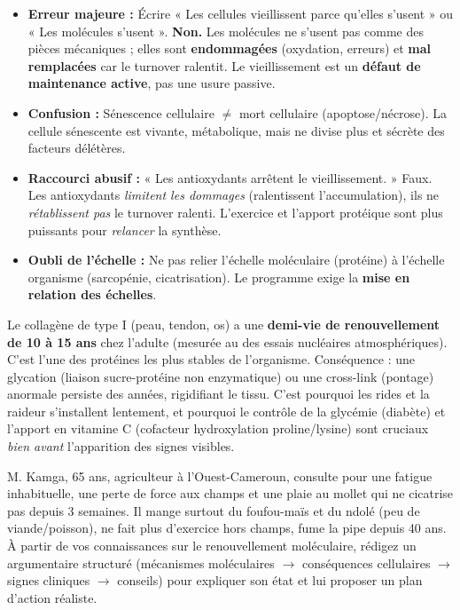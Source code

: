 \documentclass[11pt]{article}
\begin{document}
\begin{attention}
\begin{itemize}
    \item \textbf{Erreur majeure :} Écrire « Les cellules vieillissent parce qu'elles s'usent » ou « Les molécules s'usent ». \textbf{Non.} Les molécules ne s'usent pas comme des pièces mécaniques ; elles sont \textbf{endommagées} (oxydation, erreurs) et \textbf{mal remplacées} car le turnover ralentit. Le vieillissement est un \textbf{défaut de maintenance active}, pas une usure passive.
    \item \textbf{Confusion :} Sénescence cellulaire $\neq$ mort cellulaire (apoptose/nécrose). La cellule sénescente est vivante, métabolique, mais ne divise plus et sécrète des facteurs délétères.
    \item \textbf{Raccourci abusif :} « Les antioxydants arrêtent le vieillissement. » Faux. Les antioxydants \emph{limitent les dommages} (ralentissent l'accumulation), ils ne \emph{rétablissent pas} le turnover ralenti. L'exercice et l'apport protéique sont plus puissants pour \emph{relancer} la synthèse.
    \item \textbf{Oubli de l'échelle :} Ne pas relier l'échelle moléculaire (protéine) à l'échelle organisme (sarcopénie, cicatrisation). Le programme exige la \textbf{mise en relation des échelles}.
\end{itemize}
\end{attention}

\begin{savaistu}
Le collagène de type I (peau, tendon, os) a une \textbf{demi-vie de renouvellement de 10 à 15 ans} chez l'adulte (mesurée au  des essais nucléaires atmosphériques). C'est l'une des protéines les plus stables de l'organisme. Conséquence : une glycation (liaison sucre-protéine non enzymatique) ou une cross-link (pontage) anormale persiste des années, rigidifiant le tissu. C'est pourquoi les rides et la raideur s'installent lentement, et pourquoi le contrôle de la glycémie (diabète) et l'apport en vitamine C (cofacteur hydroxylation proline/lysine) sont cruciaux \emph{bien avant} l'apparition des signes visibles.
\end{savaistu}

\begin{exercice}
M. Kamga, 65 ans, agriculteur à l'Ouest-Cameroun, consulte pour une fatigue inhabituelle, une perte de force aux champs et une plaie au mollet qui ne cicatrise pas depuis 3 semaines. Il mange surtout du foufou-maïs et du ndolé (peu de viande/poisson), ne fait plus d'exercice hors champs, fume la pipe depuis 40 ans.
À partir de vos connaissances sur le renouvellement moléculaire, rédigez un argumentaire structuré (mécanismes moléculaires $\rightarrow$ conséquences cellulaires $\rightarrow$ signes cliniques $\rightarrow$ conseils) pour expliquer son état et lui proposer un plan d'action réaliste.
\end{exercice}
\end{document}
